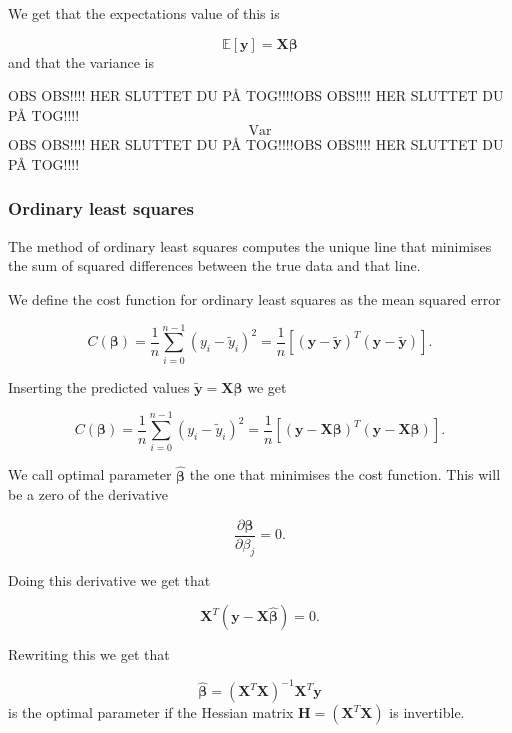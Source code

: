 We get that the expectations value of this is

\begin{equation}\label{eq:expectation_y}
\mathbb{E}[\mathbf y] = \mathbf{X}\boldsymbol{\beta}
\end{equation}
and that the variance is

OBS OBS!!!! HER SLUTTET DU PÅ TOG!!!!OBS OBS!!!! HER SLUTTET DU PÅ TOG!!!!
\begin{equation}\label{eq:variance_y}
\mbox{Var}
\end{equation}
OBS OBS!!!! HER SLUTTET DU PÅ TOG!!!!OBS OBS!!!! HER SLUTTET DU PÅ TOG!!!!

\subsubsection{Ordinary least squares}

The method of ordinary least squares computes the unique line that minimises the sum of squared differences between the true data and that line. 

We define the cost function for ordinary least squares as the mean squared error

$$
C(\boldsymbol\beta) = \frac{1}{n}\sum_{i=0}^{n-1}(y_i-\tilde{y}_i)^2=\frac{1}{n}\left[(\mathbf{y}-\mathbf{\tilde y})^T(\mathbf{y}-\mathbf{\tilde y}) \right].
$$


Inserting the predicted values $\mathbf{\tilde y}=\mathbf{X}\boldsymbol\beta$ we get

$$
C(\boldsymbol\beta) = \frac{1}{n}\sum_{i=0}^{n-1}(y_i-\tilde{y}_i)^2=\frac{1}{n}\left[(\mathbf{y}-\mathbf{X}\boldsymbol\beta)^T(\mathbf{y}-\mathbf{X}\boldsymbol\beta) \right].
$$

We call optimal parameter $\hat{\boldsymbol\beta}$ the one that minimises the cost function. This will be a zero of the derivative

$$
\frac{\partial \boldsymbol\beta}{\partial \beta_j} = 0.
$$

Doing this derivative we get that

$$
\mathbf{X}^T (\mathbf{y}-\mathbf{X}\hat{\boldsymbol{\beta}} )=0.
$$

Rewriting this we get that

\begin{equation}\label{eq:beta_OLS}
    \hat{\boldsymbol\beta}=(\mathbf{X}^T\mathbf{X})^{-1}\mathbf{X}^T\mathbf{y}
\end{equation}
is the optimal parameter if the Hessian matrix $\mathbf{H}=(\mathbf{X}^T\mathbf{X})$ is invertible. 


